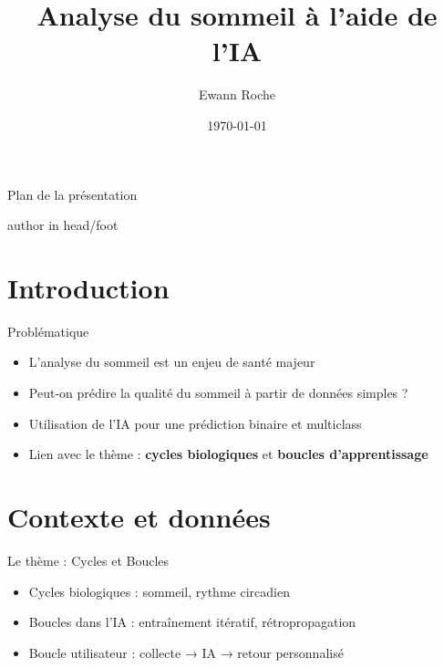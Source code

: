 \documentclass{beamer}
\title[TIPE - Cycles et Boucles]{Analyse du sommeil à l'aide de l'IA}
\author{Ewann Roche}
\date{\today}
\begin{document}
{
  \begin{frame}
    \titlepage
  \end{frame}
}

\begin{frame}[plain]{Plan de la présentation}

  \vspace*{2.5cm}

  \begin{center}
    \tableofcontents
  \end{center}

  \vspace*{2.5cm}
  \begin{beamercolorbox}[wd=\paperwidth,ht=2ex,dp=0.1ex,center]{author in head/foot}
  \end{beamercolorbox}
\end{frame}

\section{Introduction}

\begin{frame}{Problématique}
  \begin{itemize}
    \item L'analyse du sommeil est un enjeu de santé majeur
    \item Peut-on prédire la qualité du sommeil à partir de données simples ?
    \item Utilisation de l'IA pour une prédiction binaire et multiclass
    \item Lien avec le thème : \textbf{cycles biologiques} et \textbf{boucles d'apprentissage}
  \end{itemize}
\end{frame}

\section{Contexte et données}

\begin{frame}{Le thème : Cycles et Boucles}
  \begin{itemize}
    \item Cycles biologiques : sommeil, rythme circadien
    \item Boucles dans l'IA : entraînement itératif, rétropropagation
    \item Boucle utilisateur : collecte → IA → retour personnalisé
  \end{itemize}
\end{frame}
\end{document}
